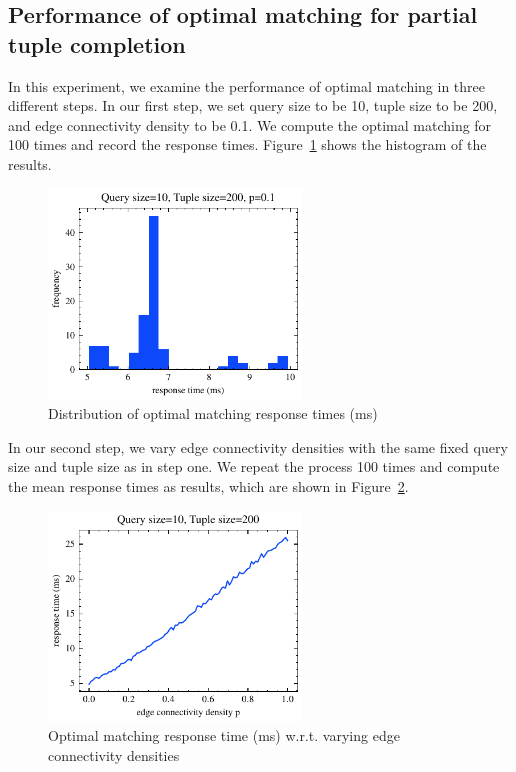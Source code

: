 \subsection{Performance of optimal matching for partial tuple completion}
In this experiment, we examine the performance of optimal matching in three different steps.
In our first step, we set query size to be 10, tuple size to be 200, and edge connectivity density to be 0.1. We compute the optimal matching for 100 times and record the response times. Figure~\ref{fig:tuple_completion_1} shows the histogram of the results.
\begin{figure}[!th]
	\centering
	\includegraphics[width=0.6\textwidth]{my/graphics/tuple_completion_1.pdf}
	\caption{Distribution of optimal matching response times (ms)}
	\label{fig:tuple_completion_1}
\end{figure}
In our second step, we vary edge connectivity densities with the same fixed query size and tuple size as in step one. We repeat the process 100 times and compute the mean response times as results, which are shown in Figure~\ref{fig:tuple_completion_2}.
\begin{figure}[!th]
	\centering
	\includegraphics[width=0.6\textwidth]{my/graphics/tuple_completion_2.pdf}
	\caption{Optimal matching response time (ms) w.r.t. varying edge connectivity densities}
	\label{fig:tuple_completion_2}
\end{figure}
